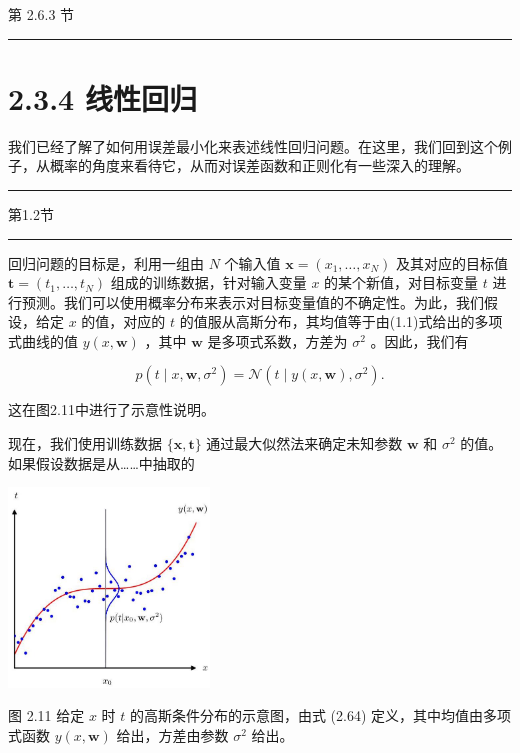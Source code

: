 \documentclass[10pt]{article}
\newcommand{\HRule}{\begin{center}\rule{0.9\linewidth}{0.2mm}\end{center}}
\begin{document}
第 2.6.3 节

\HRule

\section*{2.3.4 线性回归}

我们已经了解了如何用误差最小化来表述线性回归问题。在这里，我们回到这个例子，从概率的角度来看待它，从而对误差函数和正则化有一些深入的理解。

\HRule

第1.2节

\HRule

回归问题的目标是，利用一组由 \(N\) 个输入值 \(\mathbf{x} = \left( {{x}_{1},\ldots ,{x}_{N}}\right)\) 及其对应的目标值 \(\mathbf{t} = \left( {{t}_{1},\ldots ,{t}_{N}}\right)\) 组成的训练数据，针对输入变量 \(x\) 的某个新值，对目标变量 \(t\) 进行预测。我们可以使用概率分布来表示对目标变量值的不确定性。为此，我们假设，给定 \(x\) 的值，对应的 \(t\) 的值服从高斯分布，其均值等于由(1.1)式给出的多项式曲线的值 \(y\left( {x,\mathbf{w}}\right)\) ，其中 \(\mathbf{w}\) 是多项式系数，方差为 \({\sigma }^{2}\) 。因此，我们有

\[
p\left( {t \mid  x,\mathbf{w},{\sigma }^{2}}\right)  = \mathcal{N}\left( {t \mid  y\left( {x,\mathbf{w}}\right) ,{\sigma }^{2}}\right) . \tag{2.64}
\]

这在图2.11中进行了示意性说明。

现在，我们使用训练数据 \(\{ \mathbf{x},\mathbf{t}\}\) 通过最大似然法来确定未知参数 \(\mathbf{w}\) 和 \({\sigma }^{2}\) 的值。如果假设数据是从……中抽取的

\begin{center}
\includegraphics[max width=0.4\textwidth]{images/0194e279-9b28-703a-88f4-c3ac21e2010d_60_942_345_607_604_0.jpg}
\end{center}
\hspace*{3em} 

图 2.11 给定 \(x\) 时 \(t\) 的高斯条件分布的示意图，由式 (2.64) 定义，其中均值由多项式函数 \(y\left( {x,\mathbf{w}}\right)\) 给出，方差由参数 \({\sigma }^{2}\) 给出。
\end{document}
